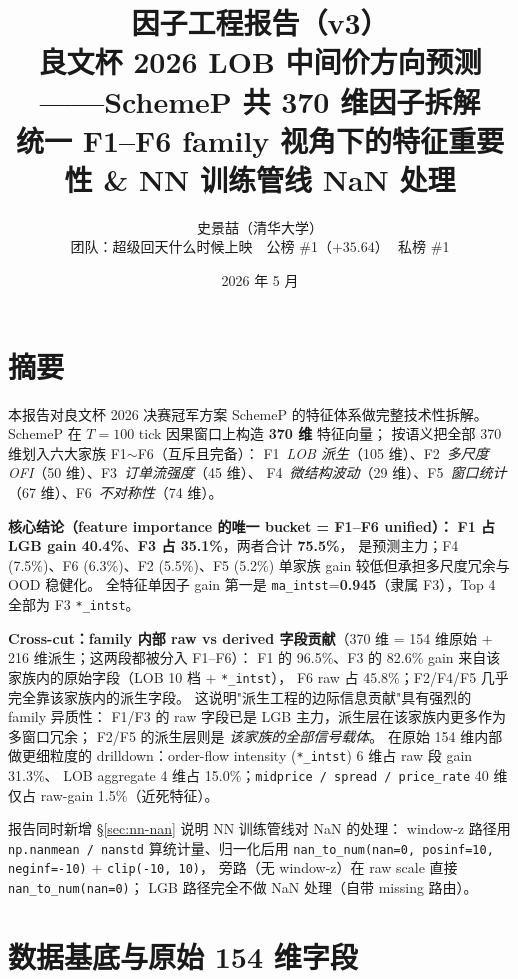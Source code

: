 \documentclass[10.5pt,a4paper]{article}
\title{\color{icmlblue}\textbf{因子工程报告（v3）}\\
\large 良文杯 2026 LOB 中间价方向预测——SchemeP 共 370 维因子拆解\\
\normalsize 统一 F1--F6 family 视角下的特征重要性 \& NN 训练管线 NaN 处理}
\author{史景喆（清华大学）\\
\small 团队：超级回天什么时候上映 \,\textbar\, 公榜 \#1（$+35.64$）\,\textbar\, 私榜 \#1}
\date{2026 年 5 月}
\begin{document}
\maketitle

\section{摘要}

本报告对良文杯 2026 决赛冠军方案 SchemeP 的特征体系做完整技术性拆解。
SchemeP 在 $T=100$ tick 因果窗口上构造 \textbf{370 维} 特征向量；
按语义把全部 370 维划入六大家族 F1$\sim$F6（互斥且完备）：
F1~\emph{LOB 派生}（105 维）、F2~\emph{多尺度 OFI}（50 维）、F3~\emph{订单流强度}（45 维）、
F4~\emph{微结构波动}（29 维）、F5~\emph{窗口统计}（67 维）、F6~\emph{不对称性}（74 维）。

\textbf{核心结论（feature importance 的唯一 bucket = F1--F6 unified）：}
\textbf{F1 占 LGB gain 40.4\%}、\textbf{F3 占 35.1\%}，两者合计 \textbf{75.5\%}，
是预测主力；F4 (7.5\%)、F6 (6.3\%)、F2 (5.5\%)、F5 (5.2\%) 单家族 gain 较低但承担多尺度冗余与 OOD 稳健化。
全特征单因子 gain 第一是 \texttt{ma\_intst}=\textbf{0.945}（隶属 F3），Top 4 全部为 F3 \texttt{*\_intst}。

\textbf{Cross-cut：family 内部 raw vs derived 字段贡献}（370 维 = 154 维原始 + 216 维派生；这两段都被分入 F1--F6）：
F1 的 96.5\%、F3 的 82.6\% gain 来自该家族内的原始字段（LOB 10 档 + \texttt{*\_intst}），
F6 raw 占 45.8\%；F2/F4/F5 几乎完全靠该家族内的派生字段。
这说明"派生工程的边际信息贡献"具有强烈的 family 异质性：
F1/F3 的 raw 字段已是 LGB 主力，派生层在该家族内更多作为多窗口冗余；
F2/F5 的派生层则是 \emph{该家族的全部信号载体}。
在原始 154 维内部做更细粒度的 drilldown：order-flow intensity (\texttt{*\_intst}) 6 维占 raw 段 gain 31.3\%、
LOB aggregate 4 维占 15.0\%；\texttt{midprice / spread / price\_rate} 40 维仅占 raw-gain 1.5\%（近死特征）。

报告同时新增 §\ref{sec:nn-nan} 说明 NN 训练管线对 NaN 的处理：
window-z 路径用 \texttt{np.nanmean / nanstd} 算统计量、归一化后用
\texttt{nan\_to\_num(nan=0, posinf=10, neginf=-10)} + \texttt{clip(-10, 10)}，
旁路（无 window-z）在 raw scale 直接 \texttt{nan\_to\_num(nan=0)}；
LGB 路径完全不做 NaN 处理（自带 missing 路由）。

\section{数据基底与原始 154 维字段}
\end{document}
